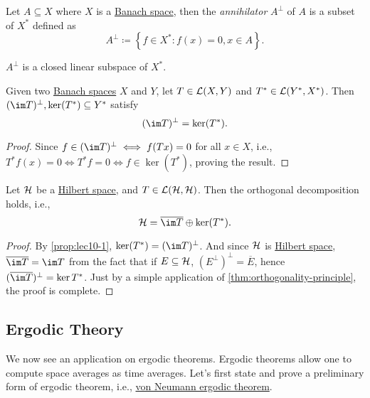 \begin{definition}[Annihilator]\label{def:annihilator}
	Let \(A \subseteq X\) where \(X\) is a \hyperref[def:Banach-space]{Banach space}, then the \emph{annihilator} \(A^\perp\) of \(A\) is a subset of \(X^{\ast} \) defined as
	\[
		A^\perp \coloneqq \left\{ f\in X^{\ast} \colon f(x) = 0, x\in A \right\}.
	\]
\end{definition}

\begin{note}
	\(A^\perp\) is a closed linear subspace of \(X^{\ast} \).
\end{note}

\begin{proposition}\label{prop:lec10-1}
	Given two  \hyperref[def:Banach-space]{Banach spaces} \(X\) and \(Y\), let \(T\in \mathcal{\MakeUppercase{l}} (X, Y)\) and \(T^{\ast} \in \mathcal{\MakeUppercase{l}} (Y^{\ast} , X^{\ast} )\). Then \((\im T)^\perp, \ker (T^{\ast} ) \subseteq Y^{\ast}\) satisfy
	\[
		(\im T)^\perp = \ker (T^{\ast} ).
	\]
\end{proposition}
\begin{proof}
	Since \(f\in (\im T)^\perp \iff f(Tx)= 0\) for all \(x\in X\), i.e., \(T^{\ast} f(x) = 0 \iff T^{\ast} f = 0\iff f\in \ker(T^{\ast})\), proving the result.
\end{proof}

\begin{corollary}
	Let \(\mathcal{\MakeUppercase{h}} \) be a \hyperref[def:Hilbert-space]{Hilbert space}, and \(T\in \mathcal{\MakeUppercase{l}} (\mathcal{\MakeUppercase{h}} , \mathcal{\MakeUppercase{h}} )\). Then the orthogonal decomposition holds, i.e.,
	\[
		\mathcal{\MakeUppercase{h}} = \overline{\im T}\oplus \ker (T^{\ast} ).
	\]
\end{corollary}
\begin{proof}
	By \autoref{prop:lec10-1}, \(\ker (T^{\ast} ) = (\im T)^\perp\). And since \(\mathcal{\MakeUppercase{h}}\) is \hyperref[def:Hilbert-space]{Hilbert space}, \(\overline{\im T} = \im T\) from the fact that if \(E \subseteq \mathcal{\MakeUppercase{h}} \), \((E^\perp)^\perp = \overline{E}\), hence \((\overline{\im T})^{\perp} = \ker T^{\ast} \). Just by a simple application of \autoref{thm:orthogonality-principle}, the proof is complete.
\end{proof}

\subsection{Ergodic Theory}
We now see an application on ergodic theorems. Ergodic theorems allow one to compute space averages as time averages. Let's first state and prove a preliminary form of ergodic theorem, i.e., \hyperref[thm:von-Neumann-ergodic]{von Neumann ergodic theorem}.

